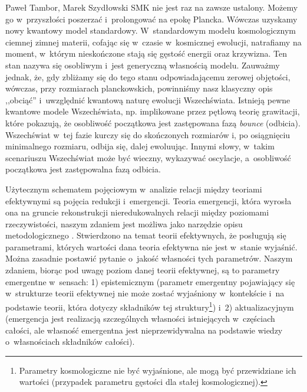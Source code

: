 \begin{artplenv2auth}{Paweł Tambor, Marek Szydłowski}
 SMK nie jest raz na zawsze ustalony. Możemy go w~przyszłości poszerzać i~prolongować na epokę Plancka. Wówczas uzyskamy nowy kwantowy model standardowy. W~standardowym modelu kosmologicznym ciemnej zimnej materii, cofając się w~czasie w~kosmicznej ewolucji, natrafiamy na moment, w~którym nieskończone stają się gęstość energii oraz krzywizna. Ten stan nazywa się osobliwym i~jest generyczną własnością modelu. Zauważmy jednak, że, gdy zbliżamy się do tego stanu odpowiadającemu zerowej objętości, wówczas, przy rozmiarach planckowskich, powinniśmy nasz klasyczny opis ,,obciąć'' i~uwzględnić kwantową naturę ewolucji Wszechświata. Istnieją pewne kwantowe modele Wszechświata, np. implikowane przez pętlową teorię grawitacji, które pokazują, że osobliwość początkowa jest zastępowana fazą \textit{bounce} (odbicia). Wszechświat w~tej fazie kurczy się do skończonych rozmiarów i, po osiągnięciu minimalnego rozmiaru, odbija się, dalej ewoluując. Innymi słowy, w~takim scenariuszu Wszechświat może być wieczny, wykazywać oscylacje, a~osobliwość początkowa jest zastępowalna fazą odbicia.

Użytecznym schematem pojęciowym w~analizie relacji między teoriami efektywnymi są pojęcia redukcji i~emergencji. Teoria emergencji, która wyrosła ona na gruncie rekonstrukcji nieredukowalnych relacji między poziomami rzeczywistości, naszym zdaniem jest możliwa jako narzędzie opisu metodologicznego
\parencite[][]{kim_making_1999}. %
 Stwierdzono na temat teorii efektywnych, że posługują się parametrami, których wartości dana teoria efektywna nie jest w~stanie wyjaśnić. Można zasadnie postawić pytanie o~jakość własności tych parametrów. Naszym zdaniem, biorąc pod uwagę poziom danej teorii efektywnej, są to parametry emergentne w~sensach: 1) epistemicznym (parametr emergentny pojawiający się w~strukturze teorii efektywnej nie może zostać wyjaśniony w~kontekście i~na podstawie teorii, która dotyczy składników tej struktury\footnote{Parametry kosmologiczne nie być wyjaśnione, ale mogą być przewidziane ich wartości (przypadek parametru gęstości dla stałej kosmologicznej).}) i~2) aktualizacyjnym (emergencja jest realizacją szczególnych własności istniejących w~częściach całości, ale własność emergentna jest nieprzewidywalna na podstawie wiedzy o~własnościach składników całości).


\end{artplenv2auth}
